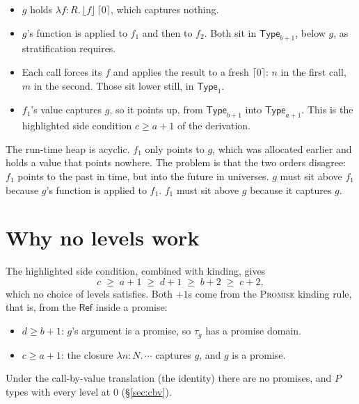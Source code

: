 \documentclass[11pt]{article}
\newcommand{\Type}[1]{\mathsf{Type}_{#1}}
\newcommand{\lam}[2]{\lambda #1{:}#2.\,}
\newcommand{\prom}[1]{\lceil #1 \rceil}
\newcommand{\frc}[1]{\lfloor #1 \rfloor}
\newcommand{\rn}[1]{\textsc{#1}}
\begin{document}
\begin{center}
\end{center}

\begin{itemize}
  \item $g$ holds $\lam{f}{R} \frc{f}\,\prom{0}$, which captures nothing.
  \item $g$'s function is applied to $f_1$ and then to $f_2$. Both sit in
    $\Type{b+1}$, below $g$, as stratification requires.
  \item Each call forces its $f$ and applies the result to a fresh
    $\prom{0}$: $n$ in the first call, $m$ in the second. Those sit lower
    still, in $\Type{1}$.
  \item $f_1$'s value captures $g$, so it points up, from $\Type{b+1}$ into
    $\Type{a+1}$. This is the highlighted side condition $c \geq a+1$ of the
    derivation.
\end{itemize}
The run-time heap is acyclic. $f_1$ only points to $g$, which was allocated
earlier and holds a value that points nowhere. The problem is that the two
orders disagree: $f_1$ points to the past in time, but into the future in
universes. $g$ must sit above $f_1$ because $g$'s function is applied to $f_1$.
$f_1$ must sit above $g$ because it captures $g$.

\section{Why no levels work}
\label{sec:why}

The highlighted side condition, combined with kinding, gives
\[
  c \;\geq\; a + 1 \;\geq\; d + 1 \;\geq\; b + 2 \;\geq\; c + 2,
\]
which no choice of levels satisfies. Both $+1$s come from the \rn{Promise}
kinding rule, that is, from the $\mathsf{Ref}$ inside a promise:
\begin{itemize}
  \item $d \geq b + 1$: $g$'s argument is a promise, so $\tau_g$ has a
    promise domain.
  \item $c \geq a + 1$: the closure $\lam{n}{N} \cdots$ captures $g$, and $g$
    is a promise.
\end{itemize}
Under the call-by-value translation (the identity) there are no promises, and
$P$ types with every level at $0$ (\S\ref{sec:cbv}).
\end{document}
